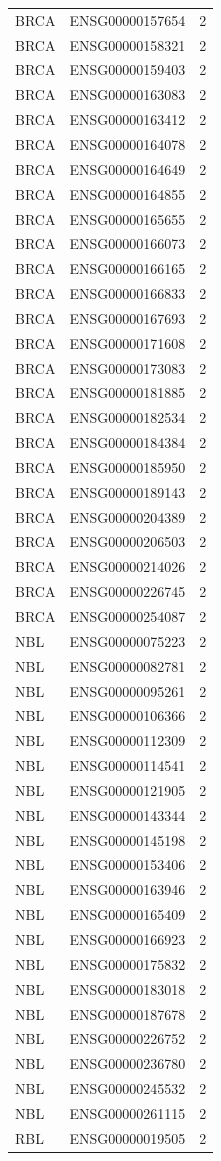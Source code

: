 \begin{longtable}{p{}p{}p{}}
BRCA & ENSG00000157654 & 2 \\
BRCA & ENSG00000158321 & 2 \\
BRCA & ENSG00000159403 & 2 \\
BRCA & ENSG00000163083 & 2 \\
BRCA & ENSG00000163412 & 2 \\
BRCA & ENSG00000164078 & 2 \\
BRCA & ENSG00000164649 & 2 \\
BRCA & ENSG00000164855 & 2 \\
BRCA & ENSG00000165655 & 2 \\
BRCA & ENSG00000166073 & 2 \\
BRCA & ENSG00000166165 & 2 \\
BRCA & ENSG00000166833 & 2 \\
BRCA & ENSG00000167693 & 2 \\
BRCA & ENSG00000171608 & 2 \\
BRCA & ENSG00000173083 & 2 \\
BRCA & ENSG00000181885 & 2 \\
BRCA & ENSG00000182534 & 2 \\
BRCA & ENSG00000184384 & 2 \\
BRCA & ENSG00000185950 & 2 \\
BRCA & ENSG00000189143 & 2 \\
BRCA & ENSG00000204389 & 2 \\
BRCA & ENSG00000206503 & 2 \\
BRCA & ENSG00000214026 & 2 \\
BRCA & ENSG00000226745 & 2 \\
BRCA & ENSG00000254087 & 2 \\
NBL & ENSG00000075223 & 2 \\
NBL & ENSG00000082781 & 2 \\
NBL & ENSG00000095261 & 2 \\
NBL & ENSG00000106366 & 2 \\
NBL & ENSG00000112309 & 2 \\
NBL & ENSG00000114541 & 2 \\
NBL & ENSG00000121905 & 2 \\
NBL & ENSG00000143344 & 2 \\
NBL & ENSG00000145198 & 2 \\
NBL & ENSG00000153406 & 2 \\
NBL & ENSG00000163946 & 2 \\
NBL & ENSG00000165409 & 2 \\
NBL & ENSG00000166923 & 2 \\
NBL & ENSG00000175832 & 2 \\
NBL & ENSG00000183018 & 2 \\
NBL & ENSG00000187678 & 2 \\
NBL & ENSG00000226752 & 2 \\
NBL & ENSG00000236780 & 2 \\
NBL & ENSG00000245532 & 2 \\
NBL & ENSG00000261115 & 2 \\
RBL & ENSG00000019505 & 2 \\
\end{longtable}

